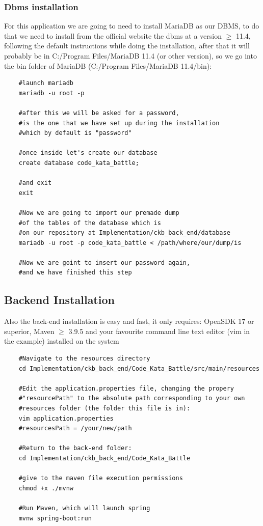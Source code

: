 \documentclass[table, 12pt]{article}
\begin{document}
\subsubsection{Dbms installation}
For this application we are going to need to install MariaDB as our DBMS, to do that we need to install from the official website the dbms at a version $\ge$ 11.4, following the default instructions while doing the installation, after that it will probably be in C:/Program Files/MariaDB 11.4 (or other version), so we go into the bin folder of MariaDB (C:/Program Files/MariaDB 11.4/bin):
\begin{lstlisting}
    #launch mariadb
    mariadb -u root -p

    #after this we will be asked for a password,
    #is the one that we have set up during the installation
    #which by default is "password"

    #once inside let's create our database
    create database code_kata_battle;

    #and exit
    exit

    #Now we are going to import our premade dump
    #of the tables of the database which is
    #on our repository at Implementation/ckb_back_end/database
    mariadb -u root -p code_kata_battle < /path/where/our/dump/is

    #Now we are goint to insert our password again,
    #and we have finished this step
\end{lstlisting}

\subsection{Backend Installation}
Also the back-end installation is easy and fast, it only requires: OpenSDK 17 or superior, Maven $\ge$ 3.9.5 and your favourite command line text editor (vim in the example) installed on the system
\begin{lstlisting}
    #Navigate to the resources directory
    cd Implementation/ckb_back_end/Code_Kata_Battle/src/main/resources

    #Edit the application.properties file, changing the propery
    #"resourcePath" to the absolute path corresponding to your own
    #resources folder (the folder this file is in):
    vim application.properties
    #resourcesPath = /your/new/path

    #Return to the back-end folder:
    cd Implementation/ckb_back_end/Code_Kata_Battle

    #give to the maven file execution permissions
    chmod +x ./mvnw

    #Run Maven, which will launch spring
    mvnw spring-boot:run

\end{lstlisting}
\newpage
\end{document}
